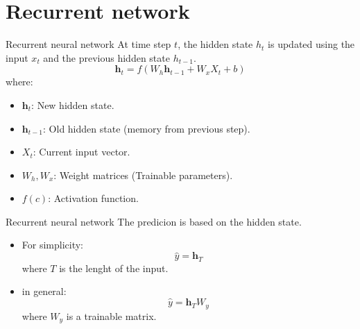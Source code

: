 \documentclass[aspectratio=169]{beamer}
\begin{document}
\section{Recurrent network}


\begin{frame}{Recurrent neural network}
	At time step $t$, the hidden state $h_t$ is updated using the input $x_t$ and the previous hidden state $h_{t-1}$.	
	\begin{equation}
		\mathbf{h}_t = f(W_h \mathbf{h}_{t-1} + W_x X_t + b)
	\end{equation}
	where:
	\begin{itemize}
		\item $\mathbf{h}_t$: New hidden state.
		\item $\mathbf{h}_{t-1}$: Old hidden state (memory from previous step).
		\item $X_t$: Current input vector.
		\item $W_h, W_x$: Weight matrices (Trainable parameters).
		\item $f(c)$: Activation function.
	\end{itemize}
\end{frame}


\begin{frame}{Recurrent neural network}
	The predicion is based on the hidden state.
	\begin{itemize}
		\item For simplicity:
		\begin{equation}
			\hat{y} = \mathbf{h}_T
		\end{equation} where $T$ is the lenght of the input.
		\item in general:
				\begin{equation}
			\hat{y} = \mathbf{h}_T W_y
		\end{equation} where $W_y$ is a trainable matrix.
	\end{itemize}
\end{frame}
\end{document}
